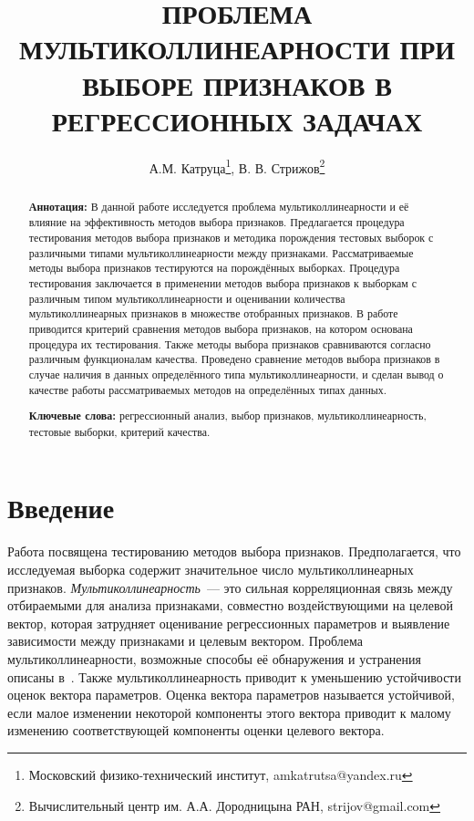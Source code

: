 \documentclass[a4paper,12pt]{article}
\theoremstyle{plain}
\begin{document}
\title{ПРОБЛЕМА МУЛЬТИКОЛЛИНЕАРНОСТИ ПРИ ВЫБОРЕ ПРИЗНАКОВ В РЕГРЕССИОННЫХ ЗАДАЧАХ}
\author{А.М. Катруца\thanks{Московский физико-технический институт, amkatrutsa@yandex.ru}, В. В. Стрижов\thanks{Вычислительный центр им. А.А. Дородницына РАН, strijov@gmail.com}}
\date{}
\maketitle
\begin{abstract}

\textbf{Аннотация:} В данной работе исследуется проблема мультиколлинеарности и её влияние на эффективность методов выбора признаков. Предлагается процедура тестирования методов выбора признаков и методика порождения тестовых выборок с различными типами мультиколлинеарности между признаками. Рассматриваемые методы выбора признаков тестируются на порождённых выборках. Процедура тестирования заключается в применении методов выбора признаков к выборкам с различным типом мультиколлинеарности и оценивании количества мультиколлинеарных признаков в множестве отобранных признаков. В работе приводится критерий сравнения методов выбора признаков, на котором основана процедура их тестирования. Также методы выбора признаков сравниваются согласно различным функционалам качества. Проведено сравнение методов выбора признаков в случае наличия в данных определённого типа мультиколлинеарности, и сделан вывод о качестве работы рассматриваемых методов на определённых типах данных.  

\textbf{Ключевые слова:} регрессионный анализ, выбор признаков, мультиколлинеарность, тестовые выборки, критерий качества. 
\end{abstract}

\section{Введение}
 
Работа посвящена тестированию методов выбора признаков. Предполагается, что исследуемая выборка содержит значительное число мультиколлинеарных признаков. \emph{Мультиколлинеарность}~--- это сильная корреляционная связь между отбираемыми для анализа признаками, совместно воздействующими на целевой вектор, которая затрудняет оценивание регрессионных параметров и выявление зависимости между признаками и целевым вектором. Проблема мультиколлинеарности, возможные способы её обнаружения и устранения описаны в~\cite{multRegression,multBayesInterpret,belsley2005regression}. Также мультиколлинеарность приводит к уменьшению устойчивости оценок вектора параметров. Оценка вектора параметров называется устойчивой, если малое изменении некоторой компоненты этого вектора приводит к малому изменению соответствующей компоненты оценки целевого вектора.
\end{document}
